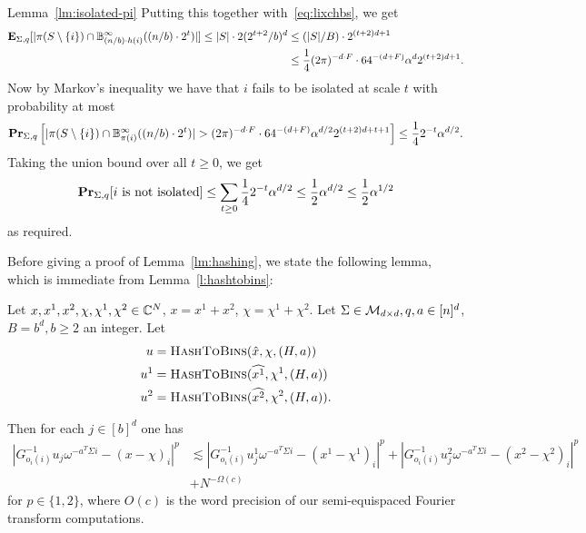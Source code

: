 \begin{proofof}{Lemma~\ref{lm:isolated-pi}}
Putting this together with~\eqref{eq:lixchbs}, we get
\begin{equation*}
\begin{split}
{\bf \mbox{\bf E}}_{\Sigma, q}[|\pi(S\setminus \{i\})\cap \mathbb{B}^\infty_{(n/b)\cdot h(i)}((n/b)\cdot 2^t)|]\leq |S|\cdot 2(2^{t+2}/b)^{d}&\leq (|S|/B)\cdot 2^{(t+2)d+1}\\
&\leq  \frac1{4}(2\pi)^{-d\cdot F}\cdot 64^{-(d+F)}\alpha^d 2^{(t+2)d+1}.
\end{split}
\end{equation*}
Now by Markov's inequality we have that $i$ fails to be isolated at scale $t$ with probability at most
$$
\prob_{\Sigma, q}\left[|\pi(S\setminus \{i\})\cap \B^\infty_{\pi(i)}((n/b)\cdot 2^t)|>\GI\cdot 64^{-(d+F)}\alpha^{d/2} 2^{(t+2)d+t+1} \right]\leq \frac1{4}2^{-t} \alpha^{d/2}.
$$
Taking the union bound over all $t\geq 0$, we get
$$
{\bf \mbox{\bf Pr}}_{\Sigma, q}[i~\text{is not isolated}]\leq \sum_{t\geq 0}\frac1{4}2^{-t} \alpha^{d/2} \leq \frac1{2}\alpha^{d/2}\leq \frac1{2}\alpha^{1/2}
$$
as required.

\end{proofof}



Before giving a proof of Lemma~\ref{lm:hashing}, we state the following lemma, which is immediate from Lemma~\ref{l:hashtobins}:
\begin{lemma}\label{lm:linearity}
Let $x, x^1, x^2, \chi, \chi^1, \chi^2\in \mathbb{C}^N$,  $x=x^1+x^2$, $\chi=\chi^1+\chi^2$.
Let $\Sigma\in \mathcal{M}_{d\times d}, q, a\in {[n]^d}$, $B=b^d, b\geq 2$ an integer. Let
\begin{equation*}
\begin{split}
u&=\Call{HashToBins}{\hat x, \chi, (H, a)} \\
u^1&=\Call{HashToBins}{\widehat{x^1}, \chi^1, (H, a)} \\
u^2&=\Call{HashToBins}{\widehat{x^2}, \chi^2, (H, a)}.
\end{split}
\end{equation*}

 Then for each  $j\in [b]^d$ one has 
\begin{equation*}
\begin{split}
|G^{-1}_{o_i(i)} u_j\omega^{-a^T\Sigma i}-(x-\chi)_i|^p&\lesssim |G^{-1}_{o_i(i)} u^1_j\omega^{-a^T\Sigma i}-(x^1-\chi^1)_i|^p+|G^{-1}_{o_i(i)} u^2_j\omega^{-a^T\Sigma i}-(x^2-\chi^2)_i|^p\\
&+N^{-\Omega(c)}
\end{split}
\end{equation*}
for $p\in \{1, 2\}$, where $O(c)$  is the word precision of our semi-equispaced Fourier transform computations.
\end{lemma}


